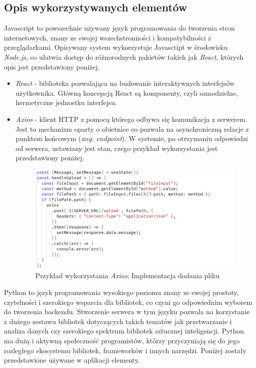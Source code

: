 \documentclass[12pt,a4paper,twoside]{article}
\begin{document}
\subsection{Opis wykorzystywanych elementów}
Javascript to powszechnie używany język programowania do tworzenia stron internetowych, znany ze swojej wszechstronności i kompatybilności z przeglądarkami. Opisywany system wykorzystuje Javasctipt w środowisku \textit{Node.js}, co ułatwia dostęp do różnorodnych pakietów takich jak \textit{React}, których opis jest przedstawiony poniżej.
\begin{itemize}
	\item \textit{React} - biblioteka pozwalająca na budowanie interaktywnych interfejsów użytkownika. Główną koncepcją React są komponenty, czyli samodzielne, hermetyczne jednostku interfejsu.
	\item \textit{Axios} - klient HTTP z pomocą którego odbywa się komunikacja z serwerem. Jest to mechanizm oparty o obietnice co pozwala na asynchroniczną relacje z punktem końcowym (\textit{ang. endpoint}). W systemie, po otrzymaniu odpowiedzi od serwera, ustawiany jest stan, czego przykład wykorzystania jest przedstawiony poniżej.
\begin{figure}[h!]
\centering
\includegraphics[width=\textwidth]{img/axios.jpg}
\caption{Przykład wykorzystania \textit{Axios}; Implementacja dodania pliku}
\end{figure}
\end{itemize}\par
Python to język programowania wysokiego poziomu znany ze swojej prostoty, czytelności i szerokiego wsparcia dla bibliotek, co czyni go odpowiednim wyborem do tworzenia backendu. 
Stworzenie serwera w tym języku pozwala na korzystanie z dużego zestawu bibliotek dotyczących takich tematów jak przetwarzanie i analiza danych czy szerokiego spektrum bibliotek sztucznej inteligencji.
Python ma dużą i aktywną społeczność programistów, którzy przyczyniają się do jego rozległego ekosystemu bibliotek, frameworków i innych narzędzi. Poniżej zostały przedstawione używane w aplikacji elementy.
\end{document}
